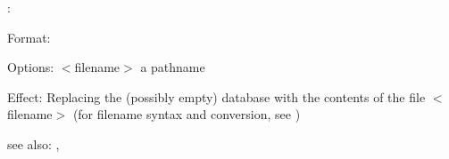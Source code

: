 \replace:

Format: 

Options: $<$filename$>$ a pathname

Effect: Replacing the (possibly empty) database  with the 
	contents of the file $<$filename$>$ (for filename syntax and
        conversion, see \consult)

see also: \destroy, \consult
